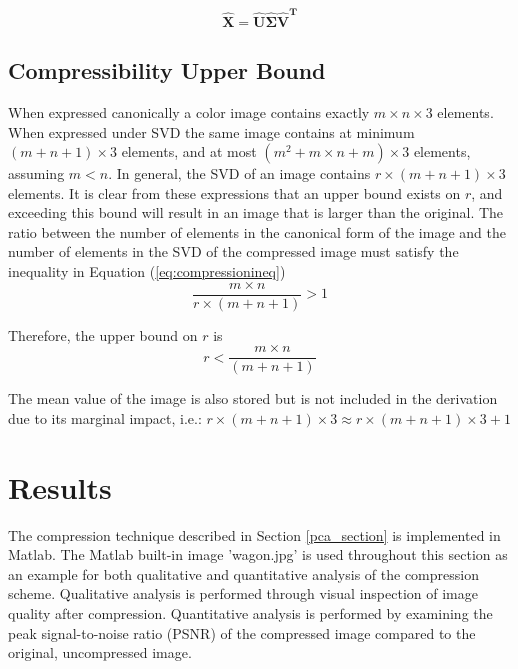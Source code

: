 \documentclass[conference]{IEEEtran}
\begin{document}
    \begin{equation}
        \mathbf{\hat{X}} = \mathbf{\hat{U}{\hat{\Sigma}}\hat{V}^T}
    \label{eq:imgrecon}
    \end{equation}

    \subsection{Compressibility Upper Bound}

    When expressed canonically a color image contains exactly $m \times n \times 3$ elements. When expressed under SVD the same image contains at minimum $(m+n+1)\times 3$ elements, and at most $(m^2 + m\times n + m) \times 3$ elements, assuming $m<n$. In general, the SVD of an image contains $r\times (m + n + 1) \times 3$ elements. It is clear from these expressions that an upper bound exists on $r$, and exceeding this bound will result in an image that is larger than the original. The ratio between the number of elements in the canonical form of the image and the number of elements in the SVD of the compressed image must satisfy the inequality in Equation (\ref{eq:compressionineq})
    \begin{equation}
        \frac{m\times n}{r\times (m + n + 1)}>1
    \label{eq:compressionineq}
    \end{equation}

    Therefore, the upper bound on $r$ is
    \begin{equation}
        r < \frac{m\times n}{(m + n + 1)}
    \end{equation}

    The mean value of the image is also stored but is not included in the derivation due to its marginal impact, i.e.: $r\times (m + n + 1) \times 3 \approx r\times (m + n + 1) \times 3 + 1$
    
    \section{Results}

    The compression technique described in Section \ref{pca_section} is implemented in Matlab. The Matlab built-in image 'wagon.jpg' is used throughout this section as an example for both qualitative and quantitative analysis of the compression scheme. Qualitative analysis is performed through visual inspection of image quality after compression. Quantitative analysis is performed by examining the peak signal-to-noise ratio (PSNR) of the compressed image compared to the original, uncompressed image.
\end{document}
